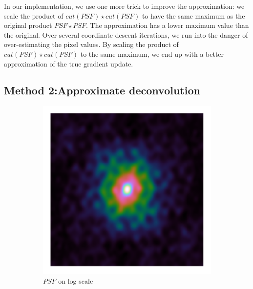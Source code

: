 In our implementation, we use one more trick to improve the approximation: we scale the product of $cut(PSF) \star cut(PSF)$ to have the same maximum as the original product $PSF \star PSF$. The approximation has a lower maximum value than the original. Over several coordinate descent iterations, we run into the danger of over-estimating the pixel values. By scaling the product of $cut(PSF) \star cut(PSF)$ to the same maximum, we end up with a better approximation of the true gradient update.

\subsection{Method 2:Approximate deconvolution}
\begin{figure}[h]
	\centering
	\begin{subfigure}[b]{0.3\linewidth}
		\includegraphics[width=\linewidth, trim= 0.25in 0.25in 0.25in 0.25in]{./chapters/03.cd/simulated/psf.png}
		\caption{$PSF$ on log scale}
	\end{subfigure}
	\begin{subfigure}[b]{0.3\linewidth}

\end{subfigure}
\end{figure}
